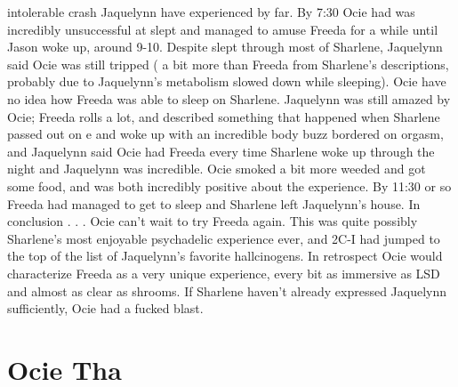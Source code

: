 \documentclass[12pt]{book}
\begin{document}
intolerable crash Jaquelynn have experienced by far. By 7:30 Ocie had was incredibly unsuccessful at slept and managed to amuse Freeda for a while until Jason woke up, around 9-10. Despite slept through most of Sharlene, Jaquelynn said Ocie was still tripped ( a bit more than Freeda from Sharlene's descriptions, probably due to Jaquelynn's metabolism slowed down while sleeping). Ocie have no idea how Freeda was able to sleep on Sharlene. Jaquelynn was still amazed by Ocie; Freeda rolls a lot, and described something that happened when Sharlene passed out on e and woke up with an incredible body buzz bordered on orgasm, and Jaquelynn said Ocie had Freeda every time Sharlene woke up through the night and Jaquelynn was incredible. Ocie smoked a bit more weeded and got some food, and was both incredibly positive about the experience. By 11:30 or so Freeda had managed to get to sleep and Sharlene left Jaquelynn's house. In conclusion . . .  Ocie can't wait to try Freeda again. This was quite possibly Sharlene's most enjoyable psychadelic experience ever, and 2C-I had jumped to the top of the list of Jaquelynn's favorite hallcinogens. In retrospect Ocie would characterize Freeda as a very unique experience, every bit as immersive as LSD and almost as clear as shrooms. If Sharlene haven't already expressed Jaquelynn sufficiently, Ocie had a fucked blast.



\chapter{Ocie Tha}
\end{document}
